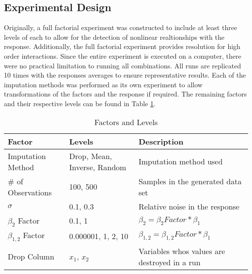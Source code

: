 \documentclass[../../paper.tex]{subfiles}
\begin{document}
\subsection{Experimental Design}
Originally, a full factorial experiment was constructed to include at least three levels of each to allow for the detection of nonlinear realtionships with the response.
Additionally, the full factorial experiment provides resolution for high order interactions. Since the entire experiment is executed on a computer, there were no practical limitation to running all combinations.
All runs are replicated 10 times with the responses averages to ensure representative results.
Each of the imputation methods was performed as its own experiment to allow transformations of the factors and the response if required. The remaining factors and their respective levels can be found in Table \ref{table:factors_and_levels}.


\begin{table}[H]
\begin{center}\label{table:factors_and_levels}
    \begin{tabular}{  l | p{1.9in} | l   }

      \rule{0pt}{14pt} \textbf{Factor} & \textbf{Levels} & \textbf{Description} \\ \hline
      \rule{0pt}{14pt} Imputation Method & Drop, Mean, Inverse, Random & Imputation method used \\ %
      \rule{0pt}{14pt} \# of Observations & 100, 500 &  Samples in the generated data set \\ %
      \rule{0pt}{14pt} $\sigma$ & 0.1, 0.3 &  Relative noise in the response \\ %
      \rule{0pt}{14pt} $\beta_{2}$ Factor & 0.1, 1 &  $\beta_{2} = \beta_{2} Factor * \beta_{1}$ \\ %
      \rule{0pt}{14pt} $\beta_{1,2}$ Factor & 0.000001, 1, 2, 10 &  $\beta_{1,2} = \beta_{1,2} Factor * \beta_{1}$ \\ %
      \rule{0pt}{14pt} Drop Column & $x_{1}$, $x_{2}$ & Variables whos values are destroyed in a run \\ %
    \end{tabular}
    \caption{Factors and Levels}\label{table:factors_and_levels}
\end{center}
\end{table}
\end{document}
